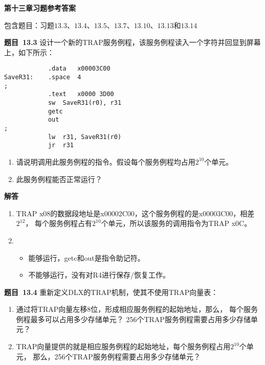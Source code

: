 \documentclass[10pt,a4paper,UTF8]{ctexart}
\newcommand{\problemname}{待定义}
\newenvironment{problem}{\begin{shaded}\par\noindent\textbf{题目\  \problemname}}{\end{shaded}\par}
\newenvironment{solution}{\par\noindent\textbf{解答}\ }{\par}
\begin{document}
\begin{center}
\LARGE\textbf{第十三章习题参考答案}
\end{center}

{\kaishu 包含题目：习题$13.3$、$13.4$、$13.5$、$13.7$、$13.10$、$13.13$和$13.14$}



	



\renewcommand{\problemname}{13.3}
\begin{problem}
	设计一个新的TRAP服务例程，该服务例程读入一个字符并回显到屏幕上，如下所示：
	\begin{lstlisting}
			.data	x00003C00 
SaveR31:	.space	4  
;		 
			.text	x0000 3D00 
			sw	SaveR31(r0), r31 
			getc 
			out 
; 
			lw	r31, SaveR31(r0) 
			jr	r31 
	\end{lstlisting}
	\begin{enumerate}[(1)]
		\item 请说明调用此服务例程的指令。假设每个服务例程均占用$2^{10}$个单元。
		\item 此服务例程能否正常运行？
	\end{enumerate}
\end{problem}

\begin{solution}
	\begin{enumerate}[(1)]
		\item TRAP x08的数据段地址是x00002C00，这个服务例程的是x00003C00，相差$2^{12}$，
		每个服务例程占有$2^{10}$个单元，所以该服务的调用指令为TRAP x0C。
		\item \begin{itemize}
			\item 能够运行，getc和out是指令助记符。
			\item 不能够运行，没有对R4进行保存/恢复工作。
		\end{itemize}
	\end{enumerate}

\end{solution}


\renewcommand{\problemname}{13.4}
\begin{problem}
	重新定义DLX的TRAP机制，使其不使用TRAP向量表：
	\begin{enumerate}[(1)]
		\item 通过将TRAP向量左移8位，形成相应服务例程的起始地址，那么，
		每个服务例程最多可以占用多少存储单元？
		256个TRAP服务例程需要占用多少存储单元？
		\item TRAP向量提供的就是相应服务例程的起始地址，每个服务例程占用$2^{10}$个单元，
		那么，256个TRAP服务例程需要占用多少存储单元？ 
	\end{enumerate}
\end{problem}
\end{document}
